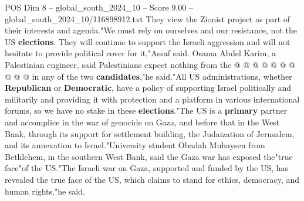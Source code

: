 \begin{textsample}{POS Dim 8 – global\_south\_2024\_10 – Score 9.00 – global\_south\_2024\_10/116898912.txt}
They view the Zionist project as part of their interests and agenda."We must rely on ourselves and our resistance, not the US \textbf{elections}.
They will continue to support the Israeli aggression and will not hesitate to provide political cover for it,"Assaf said.
Osama Abdel Karim, a Palestinian engineer, said Palestinians expect nothing from the @ @ @ @ @ @ @ @ @ @ in any of the two \textbf{candidates},"he said."All US administrations, whether \textbf{Republican} or \textbf{Democratic}, have a policy of supporting Israel politically and militarily and providing it with protection and a platform in various international forums, so we have no stake in these \textbf{elections}."The US is a \textbf{primary} partner and accomplice in the war of genocide on Gaza, and before that in the West Bank, through its support for settlement building, the Judaization of Jerusalem, and its annexation to Israel."University student Obadah Muhaysen from Bethlehem, in the southern West Bank, said the Gaza war has exposed the"true face"of the US."The Israeli war on Gaza, supported and funded by the US, has revealed the true face of the US, which claims to stand for ethics, democracy, and human rights,"he said.

\end{textsample}
